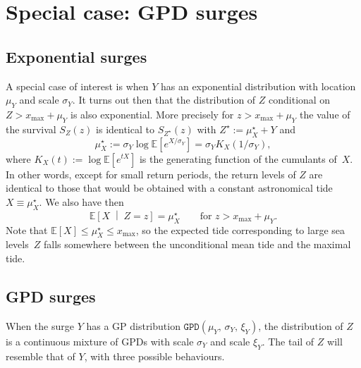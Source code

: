 \documentclass[11pt,a4paper]{report}\usepackage[]{graphicx}\usepackage[]{color}
\newcommand{\Esp}{\mathbb{E}}
\newcommand{\bCond}[2]{\left[ #1 \;\middle\vert\; #2 \right]}
\newcommand{\Up}[1]{#1_{\mathrm{max}}}
\begin{document}
\section{Special case: GPD surges }

\subsection{Exponential surges}
\label{ExpSurges} 
A special case of interest is when $Y$ has an exponential distribution with
location $\mu_Y$ and scale $\sigma_Y$.
It turns out then that the distribution of $Z$ conditional on $Z > \Up{x} + \mu_Y$ 
is also exponential. More precisely for $z > \Up{x} + \mu_Y$ the value
of the survival $S_Z(z)$ is identical to $S_{Z^\star}(z)$ with $Z^\star := \mu_X^\star + Y$ and
\begin{equation}
  \label{eq:muXStar}
  \mu_X^\star := \sigma_Y \log \Esp\left[ e^{X / \sigma_Y} \right] = \sigma_Y K_X(1 / \sigma_Y),
\end{equation}
where $K_X(t) := \log \Esp[e^{tX}]$ is the generating function of the
cumulants of~$X$. In other words, except for small return periods, the
return levels of $Z$ are identical to those that would be obtained
with a constant astronomical tide $X \equiv \mu_X^\star$. We also have
then
$$
\Esp\bCond{X}{Z=z} = \mu_X^\star \qquad \text{for }z > \Up{x} + \mu_Y.
$$ 
Note that $\Esp[X] \leqslant \mu_X^\star \leqslant \Up{x}$, so the
expected tide corresponding to large sea levels~$Z$ falls somewhere
between the unconditional mean tide and the maximal tide.

\subsection{GPD surges}
 When the surge $Y$ has
a GP distribution $\texttt{GPD}(\mu_Y,\,\sigma_Y,\,\xi_Y)$, the
distribution of $Z$ is a continuous mixture of GPDs with scale
$\sigma_Y$ and scale $\xi_Y$. The tail of $Z$ will resemble that of
$Y$, with three possible behaviours.
\end{document}
